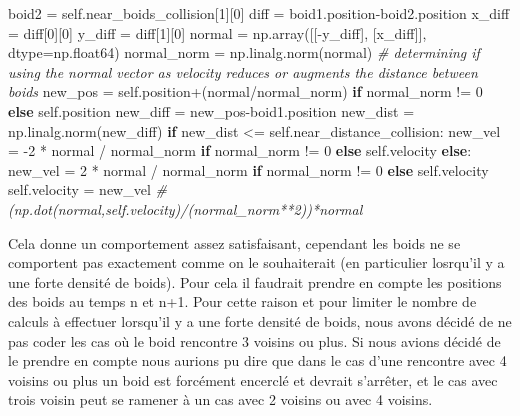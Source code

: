 \documentclass[
]{article}
\newenvironment{Shaded}{}{}
\newcommand{\CommentTok}[1]{\textcolor[rgb]{0.38,0.63,0.69}{\textit{#1}}}
\newcommand{\ControlFlowTok}[1]{\textcolor[rgb]{0.00,0.44,0.13}{\textbf{#1}}}
\newcommand{\DecValTok}[1]{\textcolor[rgb]{0.25,0.63,0.44}{#1}}
\newcommand{\NormalTok}[1]{#1}
\newcommand{\OperatorTok}[1]{\textcolor[rgb]{0.40,0.40,0.40}{#1}}
\newcommand{\VariableTok}[1]{\textcolor[rgb]{0.10,0.09,0.49}{#1}}
\begin{document}
\begin{Shaded}
\begin{Highlighting}[]
\NormalTok{            boid2 }\OperatorTok{=} \VariableTok{self}\NormalTok{.near\_boids\_collision[}\DecValTok{1}\NormalTok{][}\DecValTok{0}\NormalTok{]}
\NormalTok{            diff }\OperatorTok{=}\NormalTok{ boid1.position}\OperatorTok{{-}}\NormalTok{boid2.position}
\NormalTok{            x\_diff }\OperatorTok{=}\NormalTok{ diff[}\DecValTok{0}\NormalTok{][}\DecValTok{0}\NormalTok{]}
\NormalTok{            y\_diff }\OperatorTok{=}\NormalTok{ diff[}\DecValTok{1}\NormalTok{][}\DecValTok{0}\NormalTok{]}
\NormalTok{            normal }\OperatorTok{=}\NormalTok{ np.array([[}\OperatorTok{{-}}\NormalTok{y\_diff], [x\_diff]], dtype}\OperatorTok{=}\NormalTok{np.float64)}
\NormalTok{            normal\_norm }\OperatorTok{=}\NormalTok{ np.linalg.norm(normal)}
            \CommentTok{\# determining if using the normal vector as velocity reduces or augments the distance between boids}
\NormalTok{            new\_pos }\OperatorTok{=} \VariableTok{self}\NormalTok{.position}\OperatorTok{+}\NormalTok{(normal}\OperatorTok{/}\NormalTok{normal\_norm) }\ControlFlowTok{if}\NormalTok{ normal\_norm }\OperatorTok{!=} \DecValTok{0} \ControlFlowTok{else} \VariableTok{self}\NormalTok{.position}
\NormalTok{            new\_diff }\OperatorTok{=}\NormalTok{ new\_pos}\OperatorTok{{-}}\NormalTok{boid1.position}
\NormalTok{            new\_dist }\OperatorTok{=}\NormalTok{ np.linalg.norm(new\_diff)}
            \ControlFlowTok{if}\NormalTok{ new\_dist }\OperatorTok{\textless{}=} \VariableTok{self}\NormalTok{.near\_distance\_collision:}
\NormalTok{                new\_vel }\OperatorTok{=} \OperatorTok{{-}}\DecValTok{2} \OperatorTok{*}\NormalTok{ normal }\OperatorTok{/}\NormalTok{ normal\_norm }\ControlFlowTok{if}\NormalTok{ normal\_norm }\OperatorTok{!=} \DecValTok{0} \ControlFlowTok{else} \VariableTok{self}\NormalTok{.velocity}
            \ControlFlowTok{else}\NormalTok{:}
\NormalTok{                new\_vel }\OperatorTok{=} \DecValTok{2} \OperatorTok{*}\NormalTok{ normal }\OperatorTok{/}\NormalTok{ normal\_norm }\ControlFlowTok{if}\NormalTok{ normal\_norm }\OperatorTok{!=} \DecValTok{0} \ControlFlowTok{else} \VariableTok{self}\NormalTok{.velocity}
            \VariableTok{self}\NormalTok{.velocity }\OperatorTok{=}\NormalTok{ new\_vel}
    \CommentTok{\# (np.dot(normal,self.velocity)/(normal\_norm**2))*normal}
\end{Highlighting}
\end{Shaded}

Cela donne un comportement assez satisfaisant, cependant les boids ne se
comportent pas exactement comme on le souhaiterait (en particulier
losrqu'il y a une forte densité de boids). Pour cela il faudrait prendre
en compte les positions des boids au temps n et n+1. Pour cette raison
et pour limiter le nombre de calculs à effectuer lorsqu'il y a une forte
densité de boids, nous avons décidé de ne pas coder les cas où le boid
rencontre 3 voisins ou plus. Si nous avions décidé de le prendre en
compte nous aurions pu dire que dans le cas d'une rencontre avec 4
voisins ou plus un boid est forcément encerclé et devrait s'arrêter, et
le cas avec trois voisin peut se ramener à un cas avec 2 voisins ou avec
4 voisins.
\end{document}
